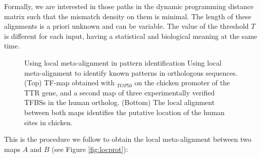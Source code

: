 Formally, we are interested in those paths in the dynamic programming distance matrix
such that the mismatch density on them is minimal. The length of these alignments is a 
priori unknown and can be variable. The value of the threshold $T$ is different for each 
input, having a statistical and biological meaning at the same time.


\begin{figure}[t!]
\begin{center}
\setlength{\fboxsep}{0pt}
          {Using local meta-alignment in pattern identification}%
          {Using local meta-alignment to identify known patterns in orthologous sequences.}%
	  {(Top) TF-map obtained with $_{TOP50}$ on the chicken promoter of the TTR gene, 
           and a second map of three experimentally verified TFBSs in the human ortholog. 
           (Bottom) The local alignment between both maps identifies the putative 
           location of the human sites in chicken.}
\end{center}
\end{figure}

This is the procedure we follow to obtain the local meta-alignment between two maps $A$ and $B$
(see Figure \ref{fig:locprot}):

